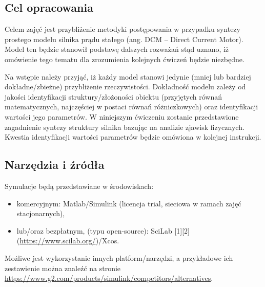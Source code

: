 \subsection{Cel opracowania}

Celem zajęć jest przybliżenie metodyki postępowania w przypadku syntezy prostego modelu silnika prądu
stałego (ang. DCM – Direct Current Motor). Model ten będzie stanowił podstawę dalszych rozważań
stąd uznano, iż omówienie tego tematu dla zrozumienia kolejnych ćwiczeń będzie niezbędne.

Na wstępie należy przyjąć, iż każdy model stanowi jedynie (mniej lub bardziej dokładne/zbieżne)
przybliżenie rzeczywistości. Dokładność modelu zależy od jakości identyfikacji struktury/złożoności
obiektu (przyjętych równań matematycznych, najczęściej w postaci równań różniczkowych) oraz
identyfikacji wartości jego parametrów. W niniejszym ćwiczeniu zostanie przedstawione zagadnienie
syntezy struktury silnika bazując na analizie zjawisk fizycznych. Kwestia identyfikacji wartości
parametrów będzie omówiona w kolejnej instrukcji.

\subsection{Narzędzia i źródła}

Symulacje będą przedstawiane w środowiskach:

\begin{itemize}
	\item komercyjnym: Matlab/Simulink (licencja trial, sieciowa w ramach zajęć stacjonarnych),
	\item lub/oraz bezpłatnym, (typu open-source): SciLab [1][2](\url{https://www.scilab.org/})/Xcos.
\end{itemize}

Możliwe jest wykorzystanie innych platform/narzędzi, a przykładowe ich zestawienie można znaleźć
na stronie \url{https://www.g2.com/products/simulink/competitors/alternatives}.